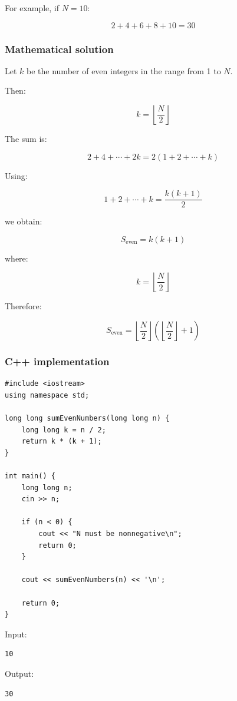 For example, if $N=10$:


\[
2+4+6+8+10=30
\]


\subsubsection{Mathematical solution}

Let $k$ be the number of even integers in the range from 1 to $N$.

Then:


\[
k=\left\lfloor\frac N2\right\rfloor
\]


The sum is:


\[
2+4+\cdots+2k =2(1+2+\cdots+k)
\]


Using:


\[
1+2+\cdots+k=\frac{k(k+1)}2
\]


we obtain:


\[
\boxed{S_{\text{even}}=k(k+1)}
\]


where:


\[
\boxed{k=\left\lfloor\frac N2\right\rfloor}
\]


Therefore:


\[
\boxed{ S_{\text{even}} = \left\lfloor\frac N2\right\rfloor \left(\left\lfloor\frac N2\right\rfloor+1\right) }
\]


\subsubsection{C++ implementation}

\begin{lstlisting}[style=cppstyle]
#include <iostream>
using namespace std;

long long sumEvenNumbers(long long n) {
    long long k = n / 2;
    return k * (k + 1);
}

int main() {
    long long n;
    cin >> n;

    if (n < 0) {
        cout << "N must be nonnegative\n";
        return 0;
    }

    cout << sumEvenNumbers(n) << '\n';

    return 0;
}
\end{lstlisting}

Input:

\begin{lstlisting}[style=pseudocode]
10
\end{lstlisting}

Output:

\begin{lstlisting}[style=pseudocode]
30
\end{lstlisting}

